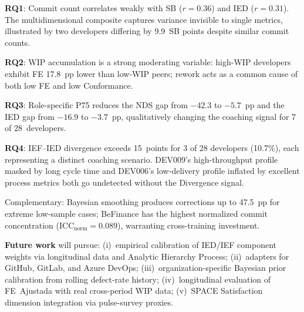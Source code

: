 \documentclass[conference]{IEEEtran}
\begin{document}
\textbf{RQ1}: Commit count correlates weakly with SB ($r=0.36$) and IED
($r=0.31$). The multidimensional composite captures variance invisible to single
metrics, illustrated by two developers differing by 9.9~SB points despite
similar commit counts.

\textbf{RQ2}: WIP accumulation is a strong moderating variable: high-WIP
developers exhibit FE 17.8~pp lower than low-WIP peers; rework acts as a common
cause of both low FE and low Conformance.

\textbf{RQ3}: Role-specific P75 reduces the NDS gap from $-42.3$ to $-5.7$~pp
and the IED gap from $-16.9$ to $-3.7$~pp, qualitatively changing the coaching
signal for 7 of 28~developers.

\textbf{RQ4}: IEF--IED divergence exceeds 15~points for 3 of 28 developers
(10.7\%), each representing a distinct coaching scenario. DEV009's high-throughput
profile masked by long cycle time and DEV006's low-delivery profile inflated by
excellent process metrics both go undetected without the Divergence signal.

Complementary: Bayesian smoothing produces corrections up to 47.5~pp for
extreme low-sample cases; BeFinance has the highest normalized commit
concentration (ICC$_\text{norm}=0.089$), warranting cross-training investment.

\textbf{Future work} will pursue: (i)~empirical calibration of IED/IEF component
weights via longitudinal data and Analytic Hierarchy Process; (ii)~adapters for
GitHub, GitLab, and Azure DevOps; (iii)~organization-specific Bayesian prior
calibration from rolling defect-rate history; (iv)~longitudinal evaluation of
FE~Ajustada with real cross-period WIP data; (v)~SPACE Satisfaction dimension
integration via pulse-survey proxies.



\end{document}

